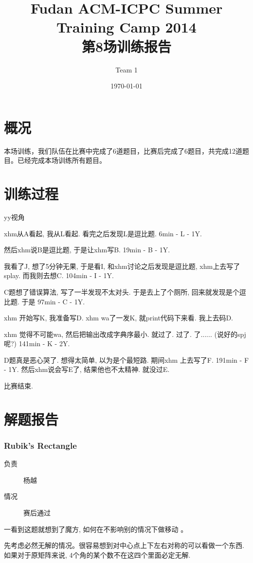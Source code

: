 \documentclass[a4paper, 11pt, nofonts, nocap, fancyhdr]{ctexart}
\title{Fudan ACM-ICPC Summer Training Camp 2014\\第8场训练报告}
\author{Team 1}
\date{\today}
\newcommand{\problem}[1]{\subsubsection{#1}}
\begin{document}
\maketitle

\section{概况}

本场训练，我们队伍在比赛中完成了6道题目，比赛后完成了6题目，共完成12道题目。已经完成本场训练所有题目。

\section{训练过程}

yy视角

xhm从A看起, 我从L看起. 看完之后发现L是逗比题. 6min - L - 1Y.

然后xhm说B是逗比题, 于是让xhm写B. 19min - B - 1Y.

我看了J, 想了5分钟无果, 于是看I, 和xhm讨论之后发现是逗比题, xhm上去写了splay. 而我则去想C. 104min - I - 1Y.

C题想了错误算法, 写了一半发现不太对头. 于是去上了个厕所, 回来就发现是个逗比题. 于是 97min - C - 1Y.

xhm 开始写K, 我准备写D. xhm wa了一发K, 就print代码下来看. 我上去码D. 

xhm 觉得不可能wa, 然后把输出改成字典序最小. 就过了. 过了. 了...... (说好的spj呢?) 141min - K - 2Y.

D题真是恶心哭了. 想得太简单, 以为是个最短路.  期间xhm 上去写了F. 191min - F - 1Y. 然后xhm说会写E了, 结果他也不太精神. 就没过E.

比赛结束.

\section{解题报告}

\problem{Rubik’s Rectangle}

\begin{description}
\item[负责] 杨越
\item[情况] 赛后通过
\end{description}

一看到这题就想到了魔方,  如何在不影响别的情况下做移动 。

先考虑必然无解的情况。很容易想到对中心点上下左右对称的可以看做一个东西. 如果对于原矩阵来说, 4个角的某个数不在这四个里面必定无解.
\end{document}
